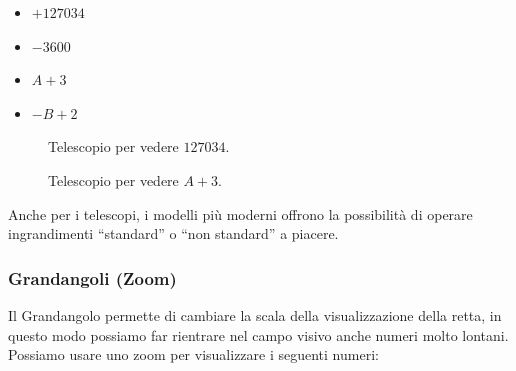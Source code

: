 \begin{multicols}{4}
\begin{itemize}[nosep]
 \item $+127034$
 \item $-3600$
 \item $A+3$
 \item $-B+2$
\end{itemize}
\end{multicols}
\vspace{-5mm}
\begin{figure}[h]
\begin{inaccessibleblock}

\begin{minipage}{.48\linewidth}
 \begin{center}
\telescopioa
 \end{center}
\caption{Telescopio per vedere \(127034\).} \label{fig:telescopioa}
\end{minipage}
\hfill
\begin{minipage}{.48\linewidth}
 \begin{center}
\telescopiob
 \end{center}
\caption{Telescopio per vedere \(A+3\).} \label{fig:telescopiob}
\end{minipage}

\end{inaccessibleblock}
\end{figure}

Anche per i telescopi, i modelli più moderni offrono la possibilità di 
operare 
ingrandimenti ``standard'' o ``non standard'' a piacere.

\subsubsection{Grandangoli (Zoom)}
\label{subsec:insnum_microscopio}

Il Grandangolo permette di cambiare la scala della visualizzazione della 
retta, 
in questo modo possiamo far rientrare nel campo visivo anche numeri molto 
lontani.
Possiamo usare uno zoom per visualizzare i seguenti numeri:

